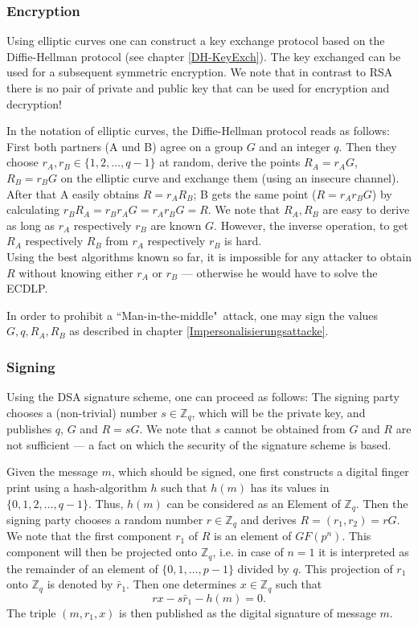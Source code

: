 \par
\subsubsection{Encryption}

Using elliptic curves one can construct a key exchange protocol based on the Diffie-Hellman protocol  (see chapter \ref{DH-KeyExch}). The key exchanged can be used for a subsequent symmetric encryption. We note that in contrast to RSA there is no pair of private and public key that can be used for encryption and decryption!

In the notation of elliptic curves, the Diffie-Hellman protocol reads as follows: First both partners (A und B) agree on a group $G$ and an integer $q$. Then they choose $r_A,r_B\in\{1,2,\dots,q-1\}$ at random, derive the points $R_A=r_AG$, $R_B=r_BG$ on the elliptic curve and exchange them (using an insecure channel). After that A easily obtains $R=r_AR_B$; B gets the same point ($R=r_Ar_B G$) by calculating $r_BR_A=r_Br_AG=r_Ar_BG=R$. We note that $R_A,R_B$ are easy to derive as long as $r_A$ respectively $r_B$ are known $G$. However, the inverse operation, to get $R_A$ respectively $R_B$ from $r_A$ respectively $r_B$ is hard.
\\ Using the best algorithms known so far, it is impossible for any attacker to obtain $R$ without knowing either $r_A$ or $r_B$ --- otherwise he would have to solve the ECDLP.

In order to prohibit a ``Man-in-the-middle"{}~attack, one may sign the values $G,q,R_A,R_B$ as described in chapter \ref{Impersonalisierungsattacke}.


\par
\subsubsection{Signing}

Using the  DSA signature scheme, one can proceed as follows: The signing party chooses a (non-trivial) number $s\in{\mathbb Z}_q$, which will be the private key, and publishes $q$, $G$ and $R=sG$. We note that $s$ cannot be obtained from $G$ and $R$ are not sufficient --- a fact on which the security of the signature scheme is based.

Given the message $m$, which should be signed, one first constructs a digital finger print using a hash-algorithm $h$ such that $h(m)$ has its values in $\{0,1,2,\dots, q-1\}$. Thus, $h(m)$ can be considered as an Element of ${\mathbb Z}_q$. Then the signing party chooses a random number $r\in{\mathbb Z}_q$ and derives $R=(r_1,r_2)=rG$. We note that the first component $r_1$ of $R$ is an element of $GF(p^n)$. This component will then be projected onto ${\mathbb Z}_q$, i.e. in case of $n=1$ it is interpreted as the remainder of an element of $\{0,1,\dots,p-1\}$ divided by $q$. This projection of $r_1$ onto ${\mathbb Z}_q$ is denoted by $\bar r_1$. Then one determines $x\in {\mathbb Z}_q$ such that
$$ rx-s\bar r_1-h(m)=0 .
$$
The triple $(m,r_1,x)$ is then published as the digital signature of message $m$.

